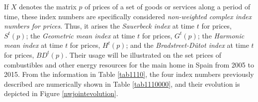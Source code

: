 If $X$ denotes the matrix $p$ of prices of a set of goods or services along a period of time, these index numbers are specifically considered \emph{non-weighted complex index numbers for prices}. Thus, it arises the \emph{Sauerbeck index} at time $t$ for prices, $S^t(p)$; the \emph{Geometric mean index} at time $t$ for prices, $G^t(p)$; the \emph{Harmonic mean index} at time $t$ for prices, $H^t(p)$; and the \emph{Bradstreet-D\^utot index} at time $t$ for prices, $BD^t(p)$.
%
Their usage will be illustrated on the set prices of combustibles and other energy resources for the main home in Spain from 2005 to 2015. From the information in Table \ref{tab1110}, the four index numbers previously described are numerically shown in Table \ref{tab1110000}, and their evolution is depicted in Figure \ref{nwjointevolution}.
  
